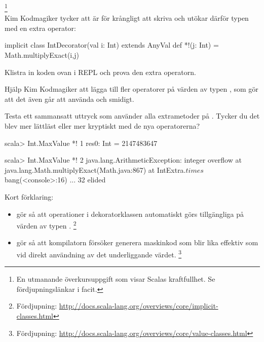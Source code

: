 {

\QUESTBEGIN

\Task\Uberkurs \what\footnote{En utmanande överkursuppgift som visar Scalas kraftfullhet. Se fördjupningslänkar i facit.}\\Kim Kodmagiker tycker att  är för krångligt att skriva och utökar därför typen  med en extra operator:

\begin{Code}
implicit class IntDecorator(val i: Int) extends AnyVal {
  def *!(j: Int) = Math.multiplyExact(i,j)
}
\end{Code}

\Subtask Klistra in koden ovan i REPL och prova den extra operatorn.

\Subtask Hjälp Kim Kodmagiker att lägga till fler operatorer på värden av typen , som gör att det även går att använda  och  smidigt.

\Subtask Testa ett sammansatt uttryck som använder alla extrametoder på . Tycker du det blev mer lättläst eller mer kryptiskt med de nya operatorerna?

\SOLUTION

\TaskSolved \what

\SubtaskSolved

\begin{REPL}
scala> Int.MaxValue *! 1
res0: Int = 2147483647

scala> Int.MaxValue *! 2
java.lang.ArithmeticException: integer overflow
  at java.lang.Math.multiplyExact(Math.java:867)
  at IntExtra.$times$bang(<console>:16)
  ... 32 elided

\end{REPL}

Kort förklaring:
\begin{itemize}
\item {} gör så att operationer i dekoratorklassen  automatiskt görs tillgängliga på värden av typen .%
\footnote{Fördjupning: \url{http://docs.scala-lang.org/overviews/core/implicit-classes.html}}

\item {} gör så att kompilatorn försöker generera maskinkod som blir lika effektiv som vid direkt användning av det underliggande värdet.%
\footnote{Fördjupning: \url{http://docs.scala-lang.org/overviews/core/value-classes.html}}
\end{itemize}


}
